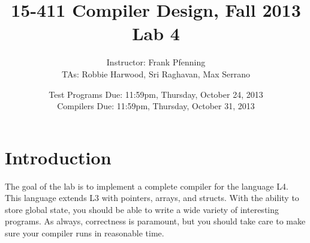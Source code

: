 \documentclass[11pt]{article}
\begin{document}
\title{15-411 Compiler Design, Fall 2013\\ Lab 4}
\author{Instructor: Frank Pfenning\\TAs: Robbie Harwood, Sri Raghavan,
  Max Serrano}
\date{Test Programs Due: 11:59pm, Thursday, October 24, 2013\\
Compilers Due: 11:59pm, Thursday, October 31, 2013}
\maketitle

\newcommand{\danger}{\textbf{!!!}}

\newcommand{\nonterm}[1]{$\langle${#1}$\rangle$}
\newcommand{\tok}[1]{$\langle$\emph{#1}$\rangle$}
\newcommand{\term}[1]{\textbf {#1}}
\newcommand{\OR}{\ensuremath{\ | \ \ }}

\newcommand{\proves}{\vdash}

\newcommand{\G}{\Gamma}
\newcommand{\cons}[2]{#1, \, #2}
\newcommand{\typed}[2]{#1 : #2}
\newcommand{\valid}[1]{#1 \; \mathit{valid}}
\newcommand{\typof}[3]{{#1} \proves \typed{#2}{#3}}

\newcommand{\tint}{\mathbf{int}}
\newcommand{\tbool}{\mathbf{bool}}
\newcommand{\etrue}{\mathbf{true}}
\newcommand{\efalse}{\mathbf{false}}
\newcommand{\eintconst}{\mathbf{intconst}}
\newcommand{\sassn}[2]{\mathbf{assign}(#1, #2)}
\newcommand{\sif}[3]{\mathbf{if}(#1, #2, #3)}
\newcommand{\swhile}[2]{\mathbf{while}(#1, #2)}
\newcommand{\sfor}[4]{\mathbf{for}(#1, #2, #3, #4)}
\newcommand{\scont}{\mathbf{continue}}
\newcommand{\sbreak}{\mathbf{break}}
\newcommand{\sret}[1]{\mathbf{return}(#1)}
\newcommand{\snop}{\mathbf{nop}}
\newcommand{\sseq}[2]{\mathbf{seq}(#1, #2)}
\newcommand{\sdecl}[3]{\mathbf{declare}(#1, #2, #3)}

\newcommand{\snil}{\mathbf{nil}}
\newcommand{\sextfdecl}[2]{\mathbf{extfdecl}(#1, #2)}
\newcommand{\sintfdecl}[2]{\mathbf{intfdecl}(#1, #2)}
\newcommand{\sfun}[3]{\mathbf{fun}(#1, #2, #3)}


\section{Introduction}

The goal of the lab is to implement a complete compiler for the
language L4.  This language extends L3 with pointers, arrays, and
structs.  With the ability to store global state, you should be able
to write a wide variety of interesting programs.  As always,
correctness is paramount, but you should take care to make sure your
compiler runs in reasonable time.
\end{document}
